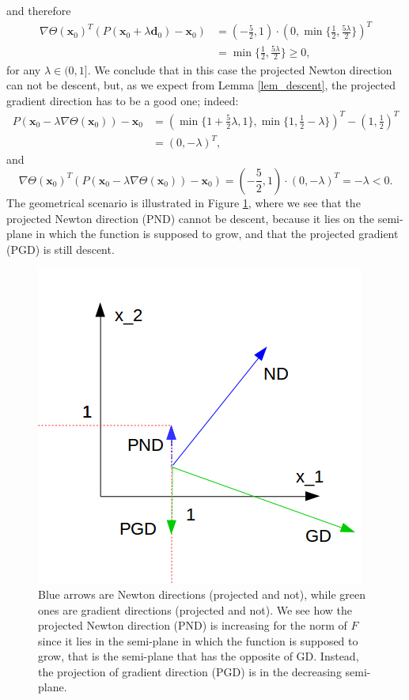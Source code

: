 and therefore
\begin{eqnarray*}
	\nabla \Theta (\textbf{x}_0)^T (P (\textbf{x}_0 +\lambda \textbf{d}_0) - \textbf{x}_0) &= \left(-\frac{5}{2}, 1\right) \cdot \left(0, \min \{\frac{1}{2}, \frac{5\lambda}{2}\}\right)^T\\
	&= \min\{ \frac{1}{2}, \frac{5 \lambda}{2} \} \geq 0,
\end{eqnarray*}
for any $ \lambda \in (0,1] $. We conclude that in this case the projected Newton direction can not be descent, but, as we expect from Lemma \ref{lem_descent}, the projected gradient direction has to be a good one; indeed:
\begin{eqnarray*}
	P (\textbf{x}_0 -\lambda \nabla \Theta (\textbf{x}_0)) - \textbf{x}_0 &= \left( \min\{1+\frac{5}{2}\lambda, 1 \},\min \{1, \frac{1}{2} - \lambda\} \right)^T - \left(1, \frac{1}{2}\right)^T \\
	&=\left(0,-\lambda \right)^T,
\end{eqnarray*}
and
\begin{equation*}
\nabla \Theta (\textbf{x}_0)^T (P (\textbf{x}_0 -\lambda \nabla \Theta (\textbf{x}_0)) - \textbf{x}_0) = \left(-\frac{5}{2}, 1\right) \cdot \left(0,-\lambda \right)^T = - \lambda < 0.
\end{equation*}
The geometrical scenario is illustrated in Figure \ref{esempio7}, where we see that the projected Newton direction (PND) cannot be descent, because it lies on the semi-plane in which the function is supposed to grow, and that the projected gradient (PGD) is still descent. 
\begin{figure}[h]
	\centering
	\includegraphics[width=0.7\linewidth]{example7}
	\caption[Newton and gradient direction]{Blue arrows are Newton directions (projected and not), while green ones are gradient directions (projected and not). We see how the projected Newton direction (PND) is increasing for the norm of $ F $ since it lies in the semi-plane in which the function is supposed to grow, that is the semi-plane that has the opposite of GD. Instead, the projection of gradient direction (PGD) is in the decreasing semi-plane.}
	\label{esempio7}
\end{figure}

